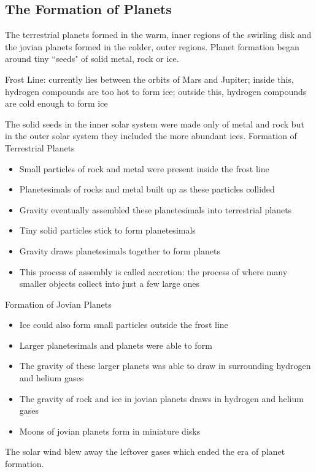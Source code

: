\documentclass[12pt]{article}
\begin{document}
\subsection{The Formation of Planets}
The terrestrial planets formed in the warm, inner regions of the swirling disk and the jovian planets formed in the colder, outer regions. Planet formation began around tiny ``seeds" of solid metal, rock or ice. 
\begin{definition} Frost Line: currently lies between the orbits of Mars and Jupiter; inside this, hydrogen compounds are too hot to form ice; outside this, hydrogen compounds are cold enough to form ice \end{definition}
The solid seeds in the inner solar system were made only of metal and rock but in the outer solar system they included the more abundant ices. \newpage
Formation of Terrestrial Planets \begin{itemize} 
\item Small particles of rock and metal were present inside the frost line
\item Planetesimals of rocks and metal built up as these particles collided 
\item Gravity eventually assembled these planetesimals into terrestrial planets 
\item Tiny solid particles stick to form planetesimals 
\item Gravity draws planetesimals together to form planets 
\item This process of assembly is called accretion: the process of where many smaller objects collect into just a few large ones \end{itemize} 
Formation of Jovian Planets \begin{itemize} 
\item Ice could also form small particles outside the frost line
\item Larger planetesimals and planets were able to form
\item The gravity of these larger planets was able to draw in surrounding hydrogen and helium gases 
\item The gravity of rock and ice in jovian planets draws in hydrogen and helium gases 
\item Moons of jovian planets form in miniature disks \end{itemize} 
The solar wind blew away the leftover gases which ended the era of planet formation. \\~\\
\end{document}
